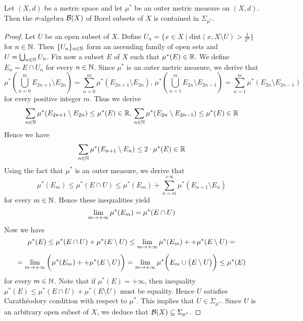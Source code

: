 \begin{theorem}
    Let $(X,d)$ be a metric space and let $\mu^*$ be an outer metric measure on $(X,d)$. Then the $\sigma$-algebra ${\mathcal B}(X)$ of Borel subsets of $X$ is contained in $\Sigma_{\mu^*}$.
\end{theorem}
\begin{proof}
    Let $U$ be an open subset of $X$. Define $U_n=\big\{x\in X\mid \mathrm{dist}\left(x,X\setminus U\right)>\frac{1}{2^n}\big\}$ for $n\in {\mathbb N}$. Then $\{U_n\}_{n\in {\mathbb N}}$ form an ascending family of open sets and $U=\bigcup_{n\in {\mathbb N}}U_n$. Fix now a subset $E$ of $X$ such that $\mu^*(E)\in {\mathbb R}$. We define $E_n=E\cap U_n$ for every $n\in {\mathbb N}$. Since $\mu^*$ is an outer metric measure, we derive that
    $$\mu^*\left(\bigcup_{n=0}^mE_{2n+1}\setminus E_{2n}\right)=\sum_{n=0}^m\mu^*(E_{2n+1}\setminus E_{2n}),\,\mu^*\left(\bigcup_{n=1}^mE_{2n}\setminus E_{2n-1}\right)=\sum_{n=1}^m\mu^*(E_{2n}\setminus E_{2n-1})$$
    for every positive integer $m$. Thus we derive
    $$\sum_{n\in {\mathbb N}}\mu^*(E_{2n+1}\setminus E_{2n})\leq \mu^*(E)\in {\mathbb R},\,\sum_{n\in {\mathbb N}}\mu^*(E_{2n}\setminus E_{2n-1})\leq \mu^*(E)\in {\mathbb R}$$
    Hence we have
    $$\sum_{n\in {\mathbb N}}\mu^*(E_{n+1}\setminus E_{n})\leq 2\cdot \mu^*(E)\in {\mathbb R}$$
    Using the fact that $\mu^*$ is an outer measure, we derive that
    $$\mu^*(E_m)\leq \mu^*(E\cap U)\leq \mu^*(E_m)+\sum_{n=m}^{+\infty}\mu^*(E_{n+1}\setminus E_n)$$
    for every $m\in {\mathbb N}$. Hence these inequalities yield
    $$\lim_{m\rightarrow +\infty}\mu^*(E_m)=\mu^*(E\cap U)$$
    Now we have
    $$\mu^*(E)\leq \mu^*(E\cap U)+\mu^*(E\setminus U) \leq \lim_{m\rightarrow +\infty}\mu^*(E_m) + + \mu^*(E\setminus U) = $$
    $$= \lim_{m\rightarrow +\infty}\bigg(\mu^*(E_m) + + \mu^*(E\setminus U)\bigg) = \lim_{m\rightarrow +\infty}\mu^*\bigg(E_m\cup \big(E\setminus U\big)\bigg) \leq \mu^*(E)$$
    for every $m\in {\mathbb N}$. Note that if $\mu^*(E)=+\infty$, then inequality $\mu^*(E)\leq \mu^*(E\cap U)+\mu^*(E\setminus U)$ must be equality. Hence $U$ satisfies Carath{\'e}odory condition with respect to $\mu^*$. This implies that $U \in \Sigma_{\mu^*}$. Since $U$ is an arbitrary open subset of $X$, we deduce that ${\mathcal B}(X)\subseteq \Sigma_{\mu^*}$.
\end{proof}































































